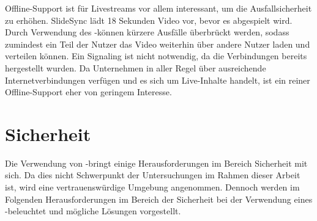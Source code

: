 Offline-Support ist für Livestreams vor allem interessant, um die Ausfallsicherheit zu erhöhen. SlideSync lädt 18 Sekunden Video vor, bevor es abgespielt wird. Durch Verwendung des \pTp-\cdn können kürzere Ausfälle überbrückt werden, sodass zumindest ein Teil der Nutzer das Video weiterhin über andere Nutzer laden und verteilen können. Ein Signaling ist nicht notwendig, da die Verbindungen bereits hergestellt wurden. Da Unternehmen in aller Regel über ausreichende Internetverbindungen verfügen und es sich um Live-Inhalte handelt, ist ein reiner Offline-Support eher von geringem Interesse. 


\section{Sicherheit}
Die Verwendung von \pTp-\cdns bringt einige Herausforderungen im Bereich Sicherheit mit sich. Da dies nicht Schwerpunkt der Untersuchungen im Rahmen dieser Arbeit ist, wird eine vertrauenswürdige Umgebung angenommen. Dennoch werden im Folgenden Herausforderungen im Bereich der Sicherheit bei der Verwendung eines \pTp-\cdns beleuchtet und mögliche Lösungen vorgestellt.

